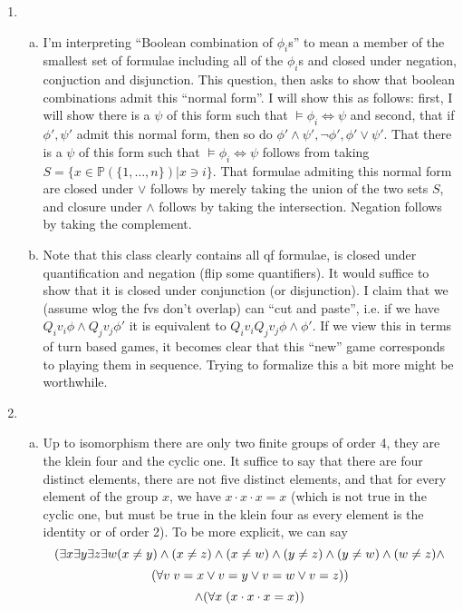 \begin{enumerate}
\item 
	\begin{enumerate}[a)] 
	\item I'm interpreting ``Boolean combination of $\phi_i$s'' to mean a member of the smallest set of formulae including all of the $\phi_i$s and closed under negation, conjuction and disjunction. This question, then asks to show that boolean combinations admit this ``normal form''. I will show this as follows: first, I will show there is a $\psi$ of this form such that $\models \phi_i \iff \psi$ and second, that if $\phi', \psi'$ admit this normal form, then so do $\phi' \land \psi', \neg \phi', \phi' \lor \psi'$. That there is a $\psi$ of this form such that $\models \phi_i \iff \psi$ follows from taking $S = \{x \in \mathbb{P}(\{1, \ldots, n\}) | x \ni i\}$. That formulae admiting this normal form are closed under $\lor$ follows by merely taking the union of the two sets $S$, and closure under $\land$ follows by taking the intersection. Negation follows by taking the complement. 
	
	\item Note that this class clearly contains all qf formulae, is closed under quantification and negation (flip some quantifiers). It would suffice to show that it is closed under conjunction (or disjunction). I claim that we (assume wlog the fvs don't overlap) can ``cut and paste'', i.e. if we have \(Q_i v_i \phi \land Q_j v_j \phi'\) it is equivalent to \(Q_i v_i Q_j v_j \phi \land \phi'\). If we view this in terms of turn based games, it becomes clear that this ``new'' game corresponds to playing them in sequence. Trying to formalize this a bit more might be worthwhile. 

	\end{enumerate}

\item  
	\begin{enumerate}[a)] 
	\item
	Up to isomorphism there are only two finite groups of order 4, they are the klein four and the cyclic one. It suffice to say that there are four distinct elements, there are not five distinct elements, and that for every element of the group $x$, we have $x \cdot x \cdot x = x$ (which is not true in the cyclic one, but must be true in the klein four as every element is the identity or of order 2). To be more explicit, we can say \[(\exists x \exists y \exists z \exists w (x \neq y) \land  (x \neq z)\land  (x \neq w)\land  (y \neq z)\land  (y \neq w) \land  (w \neq z) \land\]\[ (\forall v \; v = x \lor v = y \lor v = w \lor v = z))\]\[ \land (\forall x \; (x \cdot x \cdot x = x))\]
	

\end{enumerate}
\end{enumerate}
